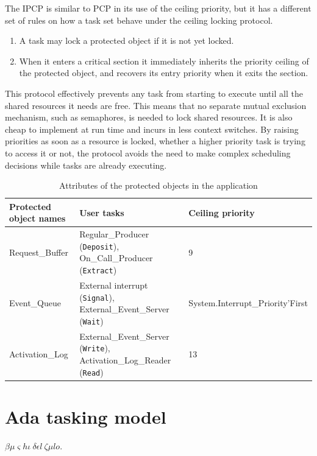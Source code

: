 \documentclass{article}
\begin{document}
The IPCP is similar to PCP in its use of the ceiling priority, but it has a different set of rules on how a task set behave under the ceiling locking protocol.

\begin{enumerate}
   \item A task may lock a protected object if it is not yet locked.
   \item When it enters a critical section it immediately inherits the priority ceiling of the protected object, and recovers its entry priority when it exits the section.
\end{enumerate}

This protocol effectively prevents any task from starting to execute until all the shared resources it needs are free. This means that no separate mutual exclusion mechanism, such as semaphores, is needed to lock shared resources. It is also cheap to implement at run time and incurs in less context switches. By raising priorities as soon as a resource is locked, whether a higher priority task is trying to access it or not, the protocol avoids the need to make complex scheduling decisions while tasks are already executing.

\begin{table}[!htbp]
   \centering
   \begin{tabular}{lll}
     \toprule
     Protected object names & User tasks & Ceiling priority  \\
     \midrule
     Request\_Buffer & Regular\_Producer (\texttt{Deposit}), On\_Call\_Producer (\texttt{Extract}) & 9 \\
     Event\_Queue & External interrupt (\texttt{Signal}), External\_Event\_Server (\texttt{Wait}) & System.Interrupt\_Priority'First \\
     Activation\_Log & External\_Event\_Server (\texttt{Write}), Activation\_Log\_Reader (\texttt{Read}) & 13 \\
     \bottomrule
   \end{tabular}
   \caption{Attributes of the protected objects in the application \cite{ycs}}
   \label{tab:po-attributes}
\end{table}

\section{Ada tasking model}

$\beta \mu \varsigma h \iota\ \delta \epsilon l\ \zeta \mu l o$.
\end{document}
